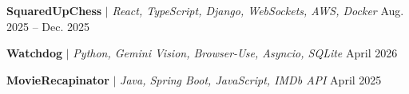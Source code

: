 \resumeSubHeadingListStart
    \vspace{4pt}

    \resumeProjectHeading
    {\textbf{SquaredUpChess} $|$ \emph{React, TypeScript, Django, WebSockets, AWS, Docker} \href{https://github.com/Azurinine/Chess-App}{\small \textcolor{gray}{\faExternalLink*}}}{Aug. 2025 -- Dec. 2025}
    \resumeItemListStart
        \vspace{-5pt}
    \resumeItemListEnd

    \vspace{2pt}
    \resumeProjectHeading
    {\textbf{Watchdog} $|$ \emph{Python, Gemini Vision, Browser-Use, Asyncio, SQLite} \href{https://github.com/Azurinine/diamondhack2026}{\small \textcolor{gray}{\faExternalLink*}}}{April 2026}
    \resumeItemListStart
    \vspace{-5pt}
    \resumeItemListEnd

    \vspace{2pt}
    \resumeProjectHeading
        {\textbf{MovieRecapinator} $|$ \emph{Java, Spring Boot, JavaScript, IMDb API} \href{https://github.com/Azurinine/movie-recap}{\small \textcolor{gray}{\faExternalLink*}}}{April 2025}
        \resumeItemListStart
            \vspace{-5pt}
        \resumeItemListEnd

\resumeSubHeadingListEnd

